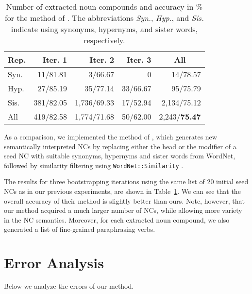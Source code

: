\documentclass[letterpaper,11pt]{article}
\newcommand{\tabref}[2][]{Table#1~\ref{#2}\xspace}
\begin{document}
\begin{table}[htb]
\begin{center}
\footnotesize
\begin{tabular}{|l|r@{ }@{ }@{ }r@{ }@{ }@{ }r|r|}
\hline
\textbf{Rep.} & \textbf{Iter. 1} & \textbf{Iter. 2} & \textbf{Iter. 3} & \multicolumn{1}{c|}{\textbf{All}} \\
\hline
Syn. & 11/81.81  & 3/66.67    & 0        & 14/78.57 \\
Hyp. & 27/85.19  & 35/77.14   & 33/66.67 & 95/75.79 \\
Sis. & 381/82.05 & 1,736/69.33 & 17/52.94 & 2,134/75.12 \\
\hline
All  & 419/82.58 & 1,774/71.68 & 50/62.00 & 2,243/\textbf{75.47} \\
\hline
\end{tabular}
\caption{Number of extracted noun compounds and accuracy in \% for the method of .
The abbreviations \textit{Syn.}, \textit{Hyp.}, and \textit{Sis.}
indicate using synonyms, hypernyms, and sister words, respectively.}
\label{tab:kim07}
\end{center}
\end{table}


As  a comparison,  we  implemented the  method of  ,
which generates  new semantically interpreted NCs  by replacing either
the  head  or the  modifier  of  a  seed  NC with  suitable  synonyms,
hypernyms  and  sister  words  from WordNet,
followed by similarity filtering using \texttt{WordNet::Similarity}
\cite{Pedersen:2004:wordnetsim}.

The  results  for  three
bootstrapping iterations using the same list of 20 initial seed NCs as
in our previous  experiments, are shown in  \tabref{tab:kim07}. We can
see that the overall accuracy of  their method is slightly better than
ours. Note, however, that our method  acquired a much larger number of
NCs, while  allowing more variety  in the NC semantics.  Moreover, for
each extracted noun compound, we also generated a list of fine-grained
paraphrasing verbs.



\section{Error Analysis}
\label{sec:erroranalysis}

Below we analyze the errors of our method.
\end{document}
